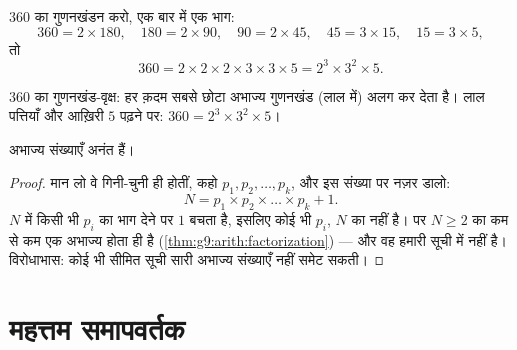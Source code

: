 \begin{example}\label{ex:g9:arith:factorization}
$360$ का गुणनखंडन करो, एक बार में एक भाग:
\[
360 = 2 \times 180, \quad
180 = 2 \times 90, \quad
90 = 2 \times 45, \quad
45 = 3 \times 15, \quad
15 = 3 \times 5,
\]
तो
\[
360 = 2 \times 2 \times 2 \times 3 \times 3 \times 5 = 2^3 \times 3^2
\times 5 .
\]
\end{example}

\begin{omfigure}

{\small $360$ का गुणनखंड-वृक्ष: हर क़दम सबसे छोटा अभाज्य गुणनखंड
(लाल में) अलग कर देता है। लाल पत्तियाँ और आख़िरी $5$ पढ़ने पर:
$360 = 2^3 \times 3^2 \times 5$।}
\end{omfigure}

\begin{theorem}[यूक्लिड]\label{thm:g9:arith:euclid}
अभाज्य संख्याएँ अनंत हैं।
\end{theorem}

\begin{proof}
मान लो वे गिनी-चुनी ही होतीं, कहो $p_1, p_2, \dots, p_k$, और इस
संख्या पर नज़र डालो:
\[
N = p_1 \times p_2 \times \dots \times p_k + 1 .
\]
$N$ में किसी भी $p_i$ का भाग देने पर  $1$ बचता है, इसलिए कोई भी
$p_i$, $N$ का  नहीं है। पर $N \geq 2$ का कम से कम एक अभाज्य 
होता ही है (\cref{thm:g9:arith:factorization}) --- और वह  हमारी सूची में नहीं है। विरोधाभास: कोई भी सीमित सूची सारी
अभाज्य संख्याएँ नहीं समेट सकती।
\end{proof}

\section{महत्तम समापवर्तक}

